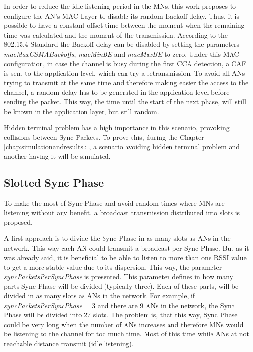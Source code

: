 In order to reduce the idle listening period in the \acp{MN}, this work proposes to configure the \ac{AN}'s \ac{MAC} Layer to disable its random 
Backoff delay. Thus, it is possible to have a constant offset time between the moment when the remaining time was calculated and the moment of the 
transmission. According to the 802.15.4 Standard the Backoff delay can be disabled by setting the parameters \textit{macMaxCSMABackoffs}, 
\textit{macMinBE} and \textit{macMaxBE} to zero. Under this \ac{MAC} configuration, in case the channel is busy during the first \ac{CCA} detection, a \ac{CAF} 
is sent to the application level, which can try a retransmission. To avoid all \acp{AN} trying to transmit at the same time and therefore making easier 
the access to the channel, a random delay has to be generated in the application level before sending the packet. This way, the time until the start of the
next phase, will still be known in the application layer, but still random.

Hidden terminal problem has a high importance in this scenario, provoking collisions between Sync Packets. To prove this, during the Chapter 
\ref{chap:simulationandresults}: , a scenario avoiding hidden terminal problem and another having it will be simulated.

\subsection{Slotted Sync Phase}
\label{subsec:slottedsyncphase}

To make the most of Sync Phase and avoid random times where \acp{MN} are listening without any benefit, a broadcast transmission distributed into slots is proposed.

A first approach is to divide the Sync Phase in as many slots as \acp{AN} in the network. This way each \ac{AN} could transmit a broadcast per Sync Phase.
But as it was already said, it is beneficial to be able to listen to more than one \ac{RSSI} value to get a more stable value due to its dispersion. This
way, the parameter \textit{syncPacketsPerSyncPhase} is presented. This parameter defines in how many parts Sync Phase will be divided (typically three). Each of 
these parts, will be divided in as many slots as \acp{AN} in the network. For example, if \textit{syncPacketsPerSyncPhase} = 3 and there are 9 \acp{AN} in the 
network, the Sync Phase will be divided into 27 slots. The problem is, that this way, Sync Phase could be very long when the number of \acp{AN} increases and therefore
\acp{MN} would be listening to the channel for too much time. Most of this time while \acp{AN} at not reachable distance transmit (idle listening).

